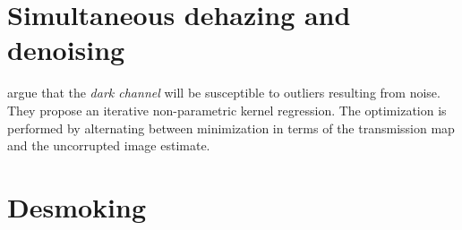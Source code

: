 \section{Simultaneous dehazing and denoising}
\cite{matlin2012removal} argue that the \textit{dark channel} will be susceptible to outliers resulting from noise. They propose an iterative non-parametric kernel regression. The optimization is performed by alternating between minimization in terms of the transmission map and the uncorrupted image estimate.


\section{Desmoking}












